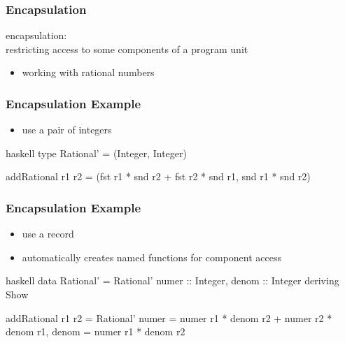 \documentclass[dvipsnames]{beamer}
\theoremstyle{plain}
\begin{document}
\begin{frame}
  \frametitle{Encapsulation}

  \begin{definition}
    \alert{encapsulation}:\\
      restricting access to some components of a program unit
  \end{definition}

  \pause
  \medskip
  \begin{example}
    \begin{itemize}
      \item working with rational numbers
    \end{itemize}
  \end{example}
\end{frame}

\begin{frame}[fragile]
  \frametitle{Encapsulation Example}

  \begin{example}[Haskell]
    \begin{itemize}
      \item use a pair of integers
    \end{itemize}

    \medskip
    \begin{pygments}{haskell}
type Rational' = (Integer, Integer)

addRational r1 r2 =
    (fst r1 * snd r2 + fst r2 * snd r1, snd r1 * snd r2)
    \end{pygments}
  \end{example}
\end{frame}

\begin{frame}[fragile]
  \frametitle{Encapsulation Example}

  \begin{example}[Haskell]
    \begin{itemize}
      \item use a record
      \item automatically creates named functions for component access
    \end{itemize}

    \medskip
    \begin{pygments}{haskell}
data Rational' =
    Rational' {numer :: Integer, denom :: Integer}
    deriving Show

addRational r1 r2 =
    Rational' {numer = numer r1 * denom r2 +
                       numer r2 * denom r1,
               denom = numer r1 * denom r2}
    \end{pygments}
  \end{example}
\end{frame}
\end{document}
